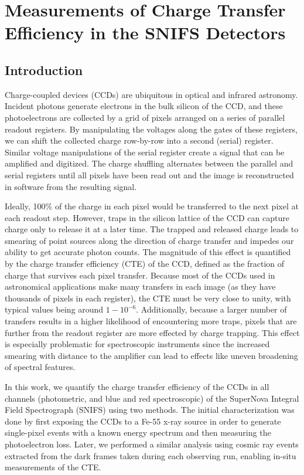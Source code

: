 \chapter{Measurements of Charge Transfer Efficiency in the SNIFS Detectors}
\label{chap:cte}

\section{Introduction}
Charge-coupled devices (CCDs) are ubiquitous in optical and infrared astronomy. Incident photons generate electrons in the bulk silicon of the CCD, and these photoelectrons are collected by a grid of pixels arranged on a series of parallel readout registers. By manipulating the voltages along the gates of these registers, we can shift the collected charge row-by-row into a second (serial) register. Similar voltage manipulations of the serial register create a signal that can be amplified and digitized. The charge shuffling alternates between the parallel and serial registers until all pixels have been read out and the image is reconstructed in software from the resulting signal.

Ideally, 100\% of the charge in each pixel would be transferred to the next pixel at each readout step. However, traps in the silicon lattice of the CCD can capture charge only to release it at a later time. The trapped and released charge leads to smearing of point sources along the direction of charge transfer and impedes our ability to get accurate photon counts. The magnitude of this effect is quantified by the charge transfer efficiency (CTE) of the CCD, defined as the fraction of charge that survives each pixel transfer. Because most of the CCDs used in astronomical applications make many transfers in each image (as they have thousands of pixels in each register), the CTE must be very close to unity, with typical values being around $1-10^{-6}$. Additionally, because a larger number of transfers results in a higher likelihood of encountering more traps, pixels that are further from the readout register are more effected by charge trapping. This effect is especially problematic for spectroscopic instruments since the increased smearing with distance to the amplifier can lead to effects like uneven broadening of spectral features.

In this work, we quantify the charge transfer efficiency of the CCDs in all channels (photometric, and blue and red spectroscopic) of the SuperNova Integral Field Spectrograph (SNIFS) using two methods. The initial characterization was done by first exposing the CCDs to a Fe-55 x-ray source in order to generate single-pixel events with a known energy spectrum and then measuring the photoelectron loss. Later, we performed a similar analysis using cosmic ray events extracted from the dark frames taken during each observing run, enabling in-situ measurements of the CTE.

